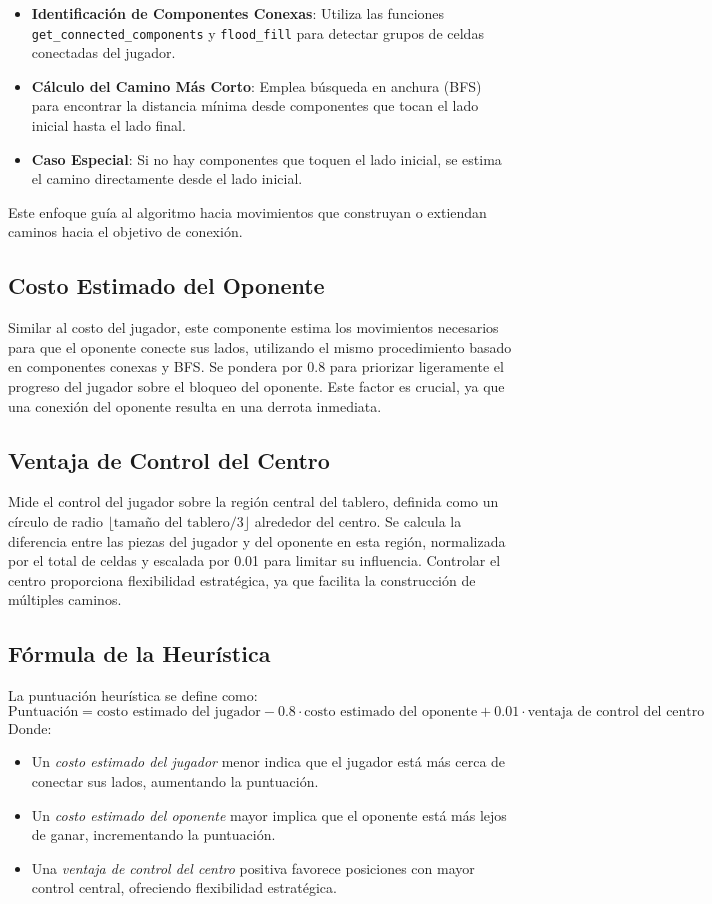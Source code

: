 \documentclass[a4paper,12pt]{article}
\begin{document}
\begin{itemize}
    \item \textbf{Identificación de Componentes Conexas}: Utiliza las funciones \texttt{get\_connected\_components} y \texttt{flood\_fill} para detectar grupos de celdas conectadas del jugador.
    \item \textbf{Cálculo del Camino Más Corto}: Emplea búsqueda en anchura (BFS) para encontrar la distancia mínima desde componentes que tocan el lado inicial hasta el lado final.
    \item \textbf{Caso Especial}: Si no hay componentes que toquen el lado inicial, se estima el camino directamente desde el lado inicial.
\end{itemize}

Este enfoque guía al algoritmo hacia movimientos que construyan o extiendan caminos hacia el objetivo de conexión.

\subsection{Costo Estimado del Oponente}
Similar al costo del jugador, este componente estima los movimientos necesarios para que el oponente conecte sus lados, utilizando el mismo procedimiento basado en componentes conexas y BFS. Se pondera por 0.8 para priorizar ligeramente el progreso del jugador sobre el bloqueo del oponente. Este factor es crucial, ya que una conexión del oponente resulta en una derrota inmediata.

\subsection{Ventaja de Control del Centro}
Mide el control del jugador sobre la región central del tablero, definida como un círculo de radio $\lfloor \text{tamaño del tablero} / 3 \rfloor$ alrededor del centro. Se calcula la diferencia entre las piezas del jugador y del oponente en esta región, normalizada por el total de celdas y escalada por 0.01 para limitar su influencia. Controlar el centro proporciona flexibilidad estratégica, ya que facilita la construcción de múltiples caminos.

\subsection{Fórmula de la Heurística}
La puntuación heurística se define como:
\[
\text{Puntuación} = \text{costo estimado del jugador} - 0.8 \cdot \text{costo estimado del oponente} + 0.01 \cdot \text{ventaja de control del centro}
\]
Donde:
\begin{itemize}
    \item Un \emph{costo estimado del jugador} menor indica que el jugador está más cerca de conectar sus lados, aumentando la puntuación.
    \item Un \emph{costo estimado del oponente} mayor implica que el oponente está más lejos de ganar, incrementando la puntuación.
    \item Una \emph{ventaja de control del centro} positiva favorece posiciones con mayor control central, ofreciendo flexibilidad estratégica.
\end{itemize}
\end{document}
